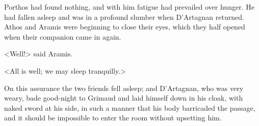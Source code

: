 Porthos had found nothing, and with him fatigue had prevailed over hunger. He had fallen asleep and was in a profound slumber when D'Artagnan returned. Athos and Aramis were beginning to close their eyes, which they half opened when their companion came in again.

<Well!> said Aramis.

<All is well; we may sleep tranquilly.>

On this assurance the two friends fell asleep; and D'Artagnan, who was very weary, bade good-night to Grimaud and laid himself down in his cloak, with naked sword at his side, in such a manner that his body barricaded the passage, and it should be impossible to enter the room without upsetting him. 